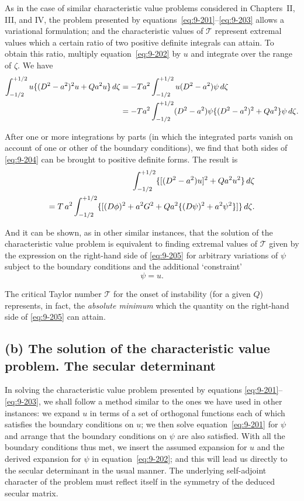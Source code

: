 As in the case of similar characteristic value problems considered in Chapters~II, III, and IV, the problem presented by equations~\eqref{eq:9-201}--\eqref{eq:9-203} allows a variational formulation; and the characteristic values of $\mathscr{T}$ represent extremal values which a certain ratio of two positive definite integrals can attain. To obtain this ratio, multiply equation~\eqref{eq:9-202} by $u$ and integrate over the range of $\zeta$. We have
\begin{align}
\int_{-1/2}^{+1/2} u\{(D^2 - a^2)^2 u + Qa^2 u\}\, d\zeta &= -\mathscr{T} a^2 \int_{-1/2}^{+1/2} u(D^2 - a^2)\psi\, d\zeta \notag \\
&= -\mathscr{T} a^2 \int_{-1/2}^{+1/2} (D^2 - a^2)\psi\{(D^2 - a^2)^2 + Qa^2\}\psi\, d\zeta. \label{eq:9-204}
\end{align}

After one or more integrations by parts (in which the integrated parts vanish on account of one or other of the boundary conditions), we find that both sides of \eqref{eq:9-204} can be brought to positive definite forms. The result is
\begin{align}
\int_{-1/2}^{+1/2} \{[(D^2 - a^2)u]^2 + Qa^2 u^2\}\, d\zeta \notag \\
= \mathscr{T}\, a^2 \int_{-1/2}^{+1/2} \{[(D\phi)^2 + a^2 G^2 + Qa^2\{(D\psi)^2 + a^2\psi^2\}]\}\, d\zeta. \label{eq:9-205}
\end{align}

And it can be shown, as in other similar instances, that the solution of the characteristic value problem is equivalent to finding extremal values of $\mathscr{T}$ given by the expression on the right-hand side of \eqref{eq:9-205} for arbitrary variations of $\psi$ subject to the boundary conditions and the additional `constraint'
\begin{equation}
[(D^2 - a^2)^2 + Qa^2]\psi = u. \label{eq:9-206}
\end{equation}

The critical Taylor number $\mathscr{T}$ for the onset of instability (for a given $Q$) represents, in fact, the \emph{absolute minimum} which the quantity on the right-hand side of \eqref{eq:9-205} can attain.

\subsection*{(b) The solution of the characteristic value problem. The secular determinant}

In solving the characteristic value problem presented by equations \eqref{eq:9-201}--\eqref{eq:9-203}, we shall follow a method similar to the ones we have used in other instances: we expand $u$ in terms of a set of orthogonal functions each of which satisfies the boundary conditions on $u$; we then solve equation~\eqref{eq:9-201} for $\psi$ and arrange that the boundary conditions on $\psi$ are also satisfied. With all the boundary conditions thus met, we insert the assumed expansion for $u$ and the derived expansion for $\psi$ in equation~\eqref{eq:9-202}; and this will lead us directly to the secular determinant in the usual manner. The underlying self-adjoint character of the problem must reflect itself in the symmetry of the deduced secular matrix.

